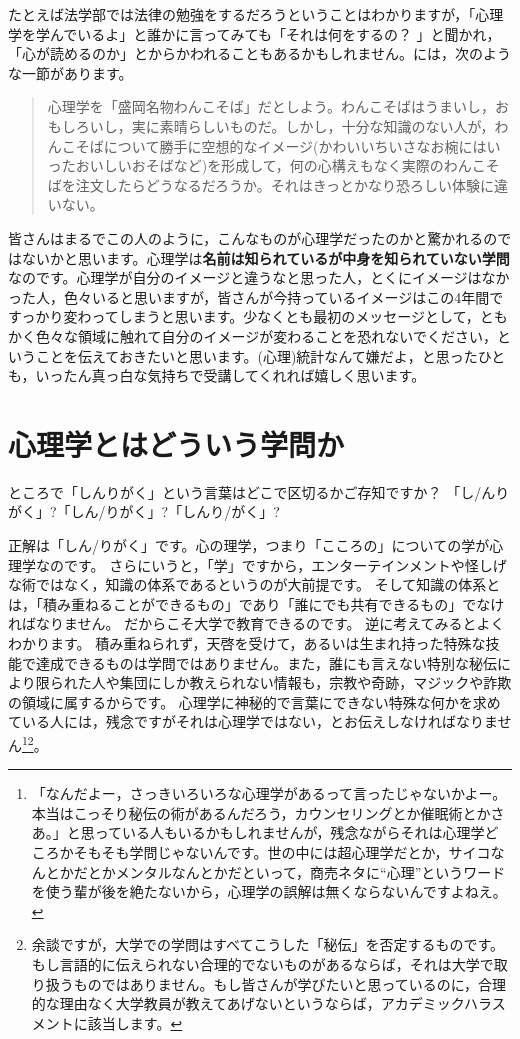 \documentclass{ltjsbook}
\begin{document}
たとえば法学部では法律の勉強をするだろうということはわかりますが，「心理学を学んでいるよ」と誰かに言ってみても「それは何をするの？ 」と聞かれ，「心が読めるのか」とからかわれることもあるかもしれません。\textcite{Michimata200903}には，次のような一節があります。

\begin{quote}
	心理学を「盛岡名物わんこそば」だとしよう。わんこそばはうまいし，おもしろいし，実に素晴らしいものだ。しかし，十分な知識のない人が，わんこそばについて勝手に空想的なイメージ(かわいいちいさなお椀にはいったおいしいおそばなど)を形成して，何の心構えもなく実際のわんこそばを注文したらどうなるだろうか。それはきっとかなり恐ろしい体験に違いない。
\end{quote}

皆さんはまるでこの人のように，こんなものが心理学だったのかと驚かれるのではないかと思います。心理学は\textbf{名前は知られているが中身を知られていない学問}なのです。心理学が自分のイメージと違うなと思った人，とくにイメージはなかった人，色々いると思いますが，皆さんが今持っているイメージはこの4年間ですっかり変わってしまうと思います。少なくとも最初のメッセージとして，ともかく色々な領域に触れて自分のイメージが変わることを恐れないでください，ということを伝えておきたいと思います。(心理)統計なんて嫌だよ，と思ったひとも，いったん真っ白な気持ちで受講してくれれば嬉しく思います。

\section{心理学とはどういう学問か}

ところで「しんりがく」という言葉はどこで区切るかご存知ですか？ 「し/んりがく」?「しん/りがく」?「しんり/がく」?

正解は「しん/りがく」です。心の理学，つまり「こころの」についての学が心理学なのです。
さらにいうと，「学」ですから，エンターテインメントや怪しげな術ではなく，知識の体系であるというのが大前提です。
そして知識の体系とは，「積み重ねることができるもの」であり「誰にでも共有できるもの」でなければなりません。
だからこそ大学で教育できるのです。
逆に考えてみるとよくわかります。
積み重ねられず，天啓を受けて，あるいは生まれ持った特殊な技能で達成できるものは学問ではありません。また，誰にも言えない特別な秘伝により限られた人や集団にしか教えられない情報も，宗教や奇跡，マジックや詐欺の領域に属するからです。
心理学に神秘的で言葉にできない特殊な何かを求めている人には，残念ですがそれは心理学ではない，とお伝えしなければなりません\footnote{「なんだよー，さっきいろいろな心理学があるって言ったじゃないかよー。本当はこっそり秘伝の術があるんだろう，カウンセリングとか催眠術とかさあ。」と思っている人もいるかもしれませんが，残念ながらそれは心理学どころかそもそも学問じゃないんです。世の中には超心理学だとか，サイコなんとかだとかメンタルなんとかだといって，商売ネタに``心理''というワードを使う輩が後を絶たないから，心理学の誤解は無くならないんですよねえ。}\footnote{余談ですが，大学での学問はすべてこうした「秘伝」を否定するものです。もし言語的に伝えられない合理的でないものがあるならば，それは大学で取り扱うものではありません。もし皆さんが学びたいと思っているのに，合理的な理由なく大学教員が教えてあげないというならば，アカデミックハラスメントに該当します。}。
\end{document}

